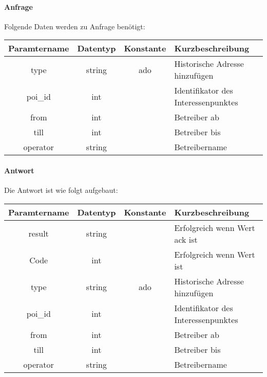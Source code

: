 \paragraph{Anfrage}Folgende Daten werden zu Anfrage benötigt:
\begin{table}[H]
	\begin{tabular}{|c|c|c|p{6.5cm}|}
		\hline
		\textbf{Paramtername} & \textbf{Datentyp} & \textbf{Konstante} & \textbf{Kurzbeschreibung}                                                                                               \\ \hline
		type                & string            & ado                & Historische Adresse hinzufügen \\ \hline
		poi\_id             & int               &                    & Identifikator des Interessenpunktes \\ \hline
		from                & int               &                    & Betreiber ab \\ \hline
		till                & int               &                    & Betreiber bis \\ \hline
		operator            & string            &                    & Betreibername \\ \hline
	\end{tabular}
\end{table}
\paragraph{Antwort}Die Antwort ist wie folgt aufgebaut:
\begin{table}[H]
	\begin{tabular}{|c|c|c|p{6.5cm}|}
		\hline
		\textbf{Paramtername} & \textbf{Datentyp} & \textbf{Konstante} & \textbf{Kurzbeschreibung}                                                                                               \\ \hline
		result              & string           &                 & Erfolgreich wenn Wert {\glqq ack\grqq} ist \\ \hline
		Code                & int              &                 & Erfolgreich wenn Wert {\glqq 0\grqq} ist \\ \hline
		type                & string           & ado             & Historische Adresse hinzufügen \\ \hline
		poi\_id             & int              &                 & Identifikator des Interessenpunktes \\ \hline
		from                & int              &                 & Betreiber ab \\ \hline
		till                & int              &                 & Betreiber bis \\ \hline
		operator            & string           &                 & Betreibername \\ \hline
	\end{tabular}
\end{table}
